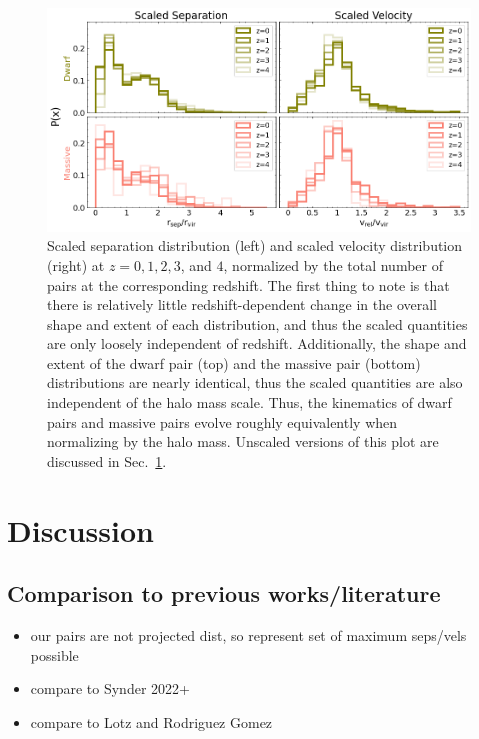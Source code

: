 \documentclass[twocolumn]{aastex631}
\begin{document}
\begin{figure}[htp]
  \centering
  \includegraphics[width=\textwidth]{scaledcombodist_1000.png}
  \caption{
      Scaled separation distribution (left) and scaled velocity distribution (right) at $z=0,1,2,3$, and $4$, normalized by the total number of pairs at the corresponding redshift. 
      The first thing to note is that there is relatively little redshift-dependent change in the overall shape and extent of each distribution, and thus the scaled quantities are only loosely independent of redshift. 
      Additionally, the shape and extent of the dwarf pair (top) and the massive pair (bottom) distributions are nearly identical, thus the scaled quantities are also independent of the halo mass scale. Thus, the kinematics of dwarf pairs and massive pairs evolve roughly equivalently when normalizing by the halo mass.
      Unscaled versions of this plot are discussed in Sec.~\ref{sec:discussion}.
  }
  \label{fig:scaled-dist}
\end{figure} 


\pagebreak
\section{Discussion}\label{sec:discussion}

\subsection{Comparison to previous works/literature}
\begin{itemize}
    \item our pairs are not projected dist, so represent set of maximum seps/vels possible
    \item compare to Synder 2022+
    \item compare to Lotz and Rodriguez Gomez 
\end{itemize}
\end{document}
